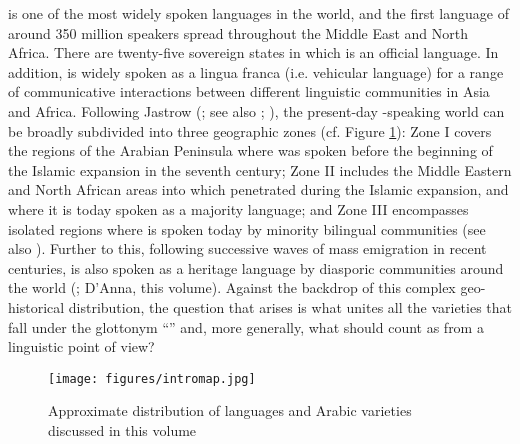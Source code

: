 \documentclass[output=paper]{langsci/langscibook}
\begin{document}
 is one of the most widely spoken languages in the world, and the first language of around 350 million speakers spread throughout the Middle East and North Africa. There are twenty-five sovereign states in which  is an official language. In addition,  is widely spoken as a lingua franca (i.e. vehicular language) for a range of communicative interactions between different linguistic communities in Asia and Africa. Following Jastrow (\citeyear{Jastrow2002}; see also \citealt{Watson2011dialectsoverview}; \citealt{Manfrediforthcoming}), the present-day -speaking world can be broadly subdivided into three geographic zones (cf. Figure \ref{intromap}): Zone I covers the regions of the Arabian Peninsula where  was spoken before the beginning of the Islamic expansion in the seventh century; Zone II includes the Middle Eastern and North African areas into which  penetrated during the Islamic expansion, and where it is today spoken as a majority language; and Zone III encompasses isolated regions where  is spoken today by minority bilingual communities (see also \citealt{Owens2000editor}). Further to this, following successive waves of mass emigration in recent centuries,  is also spoken as a heritage language by diasporic communities around the world (\citealt{Rouchdy_arabic_1992,BoumansdeRuiter2002}; D’Anna, this volume). Against the backdrop of this complex geo-historical distribution, the question that arises is what unites all the varieties that fall under the glottonym ``'' and, more generally, what should count as  from a linguistic point of view?

\begin{figure}
\texttt{[image: figures/intromap.jpg]}
\caption{Approximate distribution of languages and Arabic varieties discussed in this volume}
\label{intromap}
\end{figure}
\end{document}
